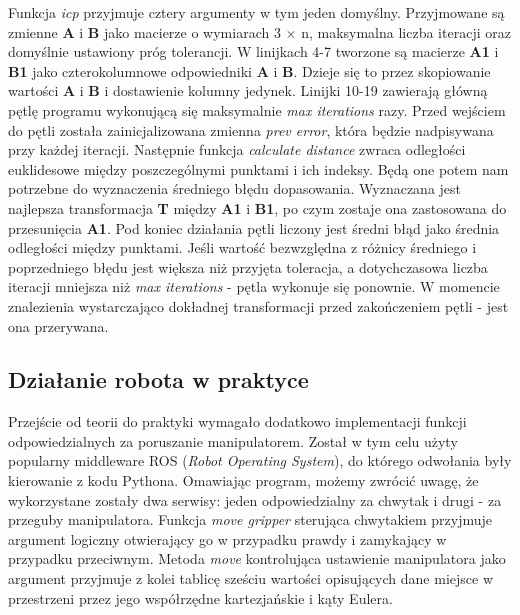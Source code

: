 \documentclass{article}
\begin{document}
Funkcja \emph{icp} przyjmuje cztery argumenty w tym jeden domyślny. Przyjmowane są zmienne \textbf{A} i \textbf{B} jako macierze o wymiarach 3 $\times$ n, maksymalna liczba iteracji oraz domyślnie ustawiony próg tolerancji. W linijkach 4-7 tworzone są macierze \textbf{A1} i \textbf{B1} jako czterokolumnowe odpowiedniki \textbf{A} i \textbf{B}. Dzieje się to przez skopiowanie wartości \textbf{A} i \textbf{B} i dostawienie kolumny jedynek. Linijki 10-19 zawierają główną pętlę programu wykonującą się maksymalnie \emph{max iterations} razy. Przed wejściem do pętli została zainicjalizowana zmienna \emph{prev error}, która będzie nadpisywana przy każdej iteracji. Następnie funkcja \emph{calculate distance} zwraca odległości euklidesowe między poszczególnymi punktami i ich indeksy. Będą one potem nam potrzebne do wyznaczenia średniego błędu dopasowania. Wyznaczana jest najlepsza transformacja \textbf{T} między \textbf{A1} i \textbf{B1}, po czym zostaje ona zastosowana do przesunięcia \textbf{A1}. Pod koniec działania pętli liczony jest średni błąd jako średnia odległości między punktami. Jeśli wartość bezwzględna z różnicy średniego i poprzedniego błędu jest większa niż przyjęta toleracja, a dotychczasowa liczba iteracji mniejsza niż \emph{max iterations} - pętla wykonuje się ponownie. W momencie znalezienia wystarczająco dokładnej transformacji przed zakończeniem pętli - jest ona przerywana.

\subsection*{\LARGE{Działanie robota w praktyce}} 

Przejście od teorii do praktyki wymagało dodatkowo implementacji funkcji odpowiedzialnych za poruszanie manipulatorem. Został w tym celu użyty popularny middleware ROS (\emph{Robot Operating System}), do którego odwołania były kierowanie z kodu Pythona. Omawiając program, możemy zwrócić uwagę, że wykorzystane zostały dwa serwisy: jeden odpowiedzialny za chwytak i drugi - za przeguby manipulatora. Funkcja \emph{move gripper} sterująca chwytakiem przyjmuje argument logiczny otwierający go w przypadku prawdy i zamykający w przypadku przeciwnym. Metoda \emph{move} kontrolująca ustawienie manipulatora jako argument przyjmuje z kolei tablicę sześciu wartości opisujących dane miejsce w przestrzeni przez jego współrzędne kartezjańskie i kąty Eulera.

\vspace{5mm}

\end{document}
